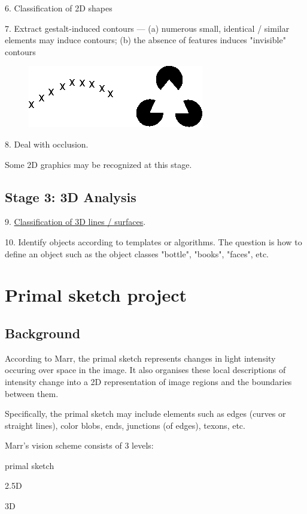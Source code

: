 6. Classification of 2D shapes

\underconst

7. Extract gestalt-induced contours --- (a) numerous small, identical / similar elements may induce contours; (b) the absence of features induces "invisible" contours

\begin{figure}[H]
\centering
\includegraphics[scale=0.6, bb=0 0 290 102]{GestaltContours.PNG}
\end{figure}

8. Deal with occlusion.

Some 2D graphics may be recognized at this stage.

\subsection{Stage 3: 3D Analysis}

9. \href{Vis-3DTaxonomy.htm}{Classification of 3D lines / surfaces}.

10. Identify objects according to templates or algorithms. The question is how to define an object such as the object classes "bottle", "books", "faces", etc.

\section{Primal sketch project}

\subsection{Background}

According to Marr, the primal sketch represents changes in light intensity occuring over space in the image. It also organises these local descriptions of intensity change into a 2D representation of image regions and the boundaries between them.

Specifically, the primal sketch may include elements such as edges (curves or straight lines), color blobs, ends, junctions (of edges), texons, etc.

Marr's vision scheme consists of 3 levels:
\begin{compactenum}
	\item primal sketch
	\item 2.5D
	\item 3D
\end{compactenum}

